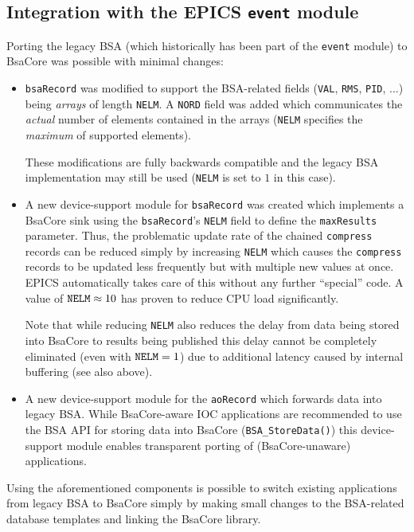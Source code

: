 \documentclass[11pt]{article}
\newcommand{\bsac}{BsaCore}
\newcommand{\bsa} {BSA}
\newcommand{\cod}[1]{{\tt#1}}
\begin{document}
\subsection*{Integration with the EPICS \cod{event} module}
Porting the legacy \bsa{} (which historically has been part of
the \cod{event} module) to \bsac{} was possible with minimal
changes:
\begin{itemize}
\item \cod{bsaRecord} was modified to support the \bsa{}-related fields
      (\cod{VAL}, \cod{RMS}, \cod{PID}, ...) being {\em arrays} of length
      \cod{NELM}. A \cod{NORD} field was added which communicates the
      {\em actual} number of elements contained in the arrays (\cod{NELM}
      specifies the {\em maximum} of supported elements).

      These modifications are fully backwards compatible and the legacy
      \bsa{} implementation may still be used (\cod{NELM} is set to $1$
      in this case).

\item A new device-support module for \cod{bsaRecord} was created which
      implements a \bsac{} sink using the \cod{bsaRecord}'s \cod{NELM}
      field to define the \cod{maxResults} parameter. Thus, the problematic
      update rate of the chained \cod{compress} records can be reduced
      simply by increasing \cod{NELM} which causes the \cod{compress}
      records to be updated less frequently but with multiple new values
      at once. EPICS automatically takes care of this without any further
      ``special'' code. A value of $\cod{NELM} \approx 10$ has proven to
      reduce CPU load significantly.

      Note that while reducing \cod{NELM} also reduces the delay from data
      being stored into \bsac{} to results being published this delay cannot
      be completely eliminated (even with $\cod{NELM} = 1$) due to additional
      latency caused by internal buffering (see also above).

\item A new device-support module for the \cod{aoRecord} which forwards
      data into legacy \bsa{}. While \bsac{}-aware IOC applications are
      recommended to use the \bsa{} API for storing data into \bsac{}
      (\cod{BSA\_StoreData()}) this device-support module enables transparent
      porting of (\bsac{}-unaware) applications.
\end{itemize}
Using the aforementioned components is possible to switch existing applications
from legacy \bsa{} to \bsac{} simply by making small changes to the \bsa{}-related
database templates and linking the \bsac{} library.
\end{document}
